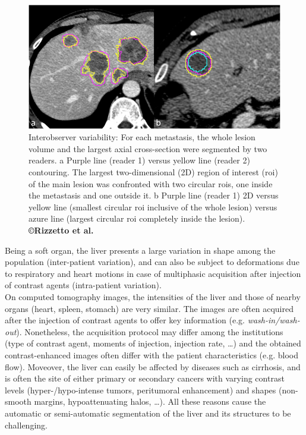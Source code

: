 \begin{figure}[!h]
	\centering        
	\includegraphics[width=0.7\linewidth]{./images/interObs1}
	\caption{Interobserver variability: For each metastasis, the whole lesion volume and the largest axial cross-section were segmented by two readers. a Purple line (reader 1) versus yellow line (reader 2) contouring. The largest two-dimensional (2D) region of interest (\ac{roi}) of the main lesion was confronted with two circular \ac{roi}s, one inside the metastasis and one outside it. b Purple line (reader 1) 2D versus yellow line (smallest circular \ac{roi} inclusive of the whole lesion) versus azure line (largest circular \ac{roi} completely inside the lesion). \textbf{©Rizzetto et al. \cite{Rizzetto2020}}}
	\label{interobserver_var}
\end{figure} 

Being a soft organ, the liver presents a large variation in shape among the population (inter-patient
variation), and can also be subject to deformations due to respiratory
and heart motions in case of multiphasic acquisition after injection of
contrast agents (intra-patient variation).\\
On computed tomography images, the intensities of the liver and
those of nearby organs (heart, spleen, stomach) are very similar. The
images are often acquired after the injection of contrast agents to
offer key information (e.g. \emph{wash-in/wash-out}). Nonetheless,
the acquisition protocol may differ among the institutions (type of
contrast agent, moments of injection, injection rate, \ldots{}) and the
obtained contrast-enhanced images often differ with the patient characteristics (e.g. blood flow).
Moveover, the liver can easily be affected by diseases such as
cirrhosis, and is often the site of either primary or secondary cancers
with varying contrast levels (hyper-/hypo-intense tumors, peritumoral
enhancement) and shapes (non-smooth margins, hypoattenuating halos,
\ldots{}). All these reasons cause the automatic or semi-automatic
segmentation of the liver and its structures to be challenging.

